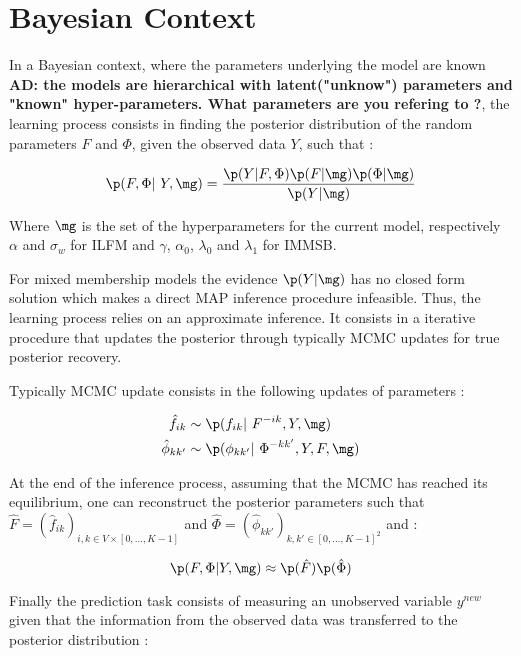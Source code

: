 \section{Bayesian Context}
\label{sec:inference}
In a Bayesian context, where the parameters underlying the model are known \textbf{AD: the models are hierarchical with latent("unknow") parameters and "known" hyper-parameters. What parameters are you refering to ?}, the learning process consists in finding the posterior distribution of the random parameters $F$ and $\Phi$, given the observed data $Y$, such that : 

\begin{equation}
    \p(F, \Phi | Y, \mg) = \frac{\p(Y|F,\Phi)\p(F|\mg)\p(\Phi|\mg)}{\p(Y|\mg)}
\end{equation}

Where $\mg$ is the set of the hyperparameters for the current model, respectively $\alpha$ and $\sigma_w$ for ILFM and $\gamma$,  $\alpha_0$, $\lambda_0$ and $\lambda_1$ for IMMSB.


For mixed membership models the evidence $\p(Y|\mg)$ has no closed form solution which makes a direct MAP inference procedure infeasible. Thus, the learning process relies on an approximate inference. It consists in a iterative procedure that updates the posterior through typically MCMC updates for true posterior recovery.

Typically MCMC update consists in the following updates of parameters :  

\begin{align}
    \hat f_{ik} &\sim \p(f_{ik} | F^{-ik}, Y, \mg) \\
    \hat \phi_{kk'} &\sim \p(\phi_{kk'} | \Phi^{-kk'}, Y, F, \mg)
\end{align}

At the end of the inference process, assuming that the MCMC has reached its  equilibrium, one can reconstruct the posterior parameters such that $\hat F = (\hat f_{ik})_{i,k \in V\times[0,\dotsc, K-1]}$ and $\hat \Phi = (\hat \phi_{kk'})_{k,k' \in [0,\dotsc, K-1]^2}$ and :

\begin{equation}
    \p(F, \Phi|Y, \mg) \approx \p(\hat F) \p(\hat \Phi)
\end{equation}

Finally the prediction task consists of measuring an unobserved variable $y^{new}$ given that the information from the observed data was transferred to the posterior distribution : 

